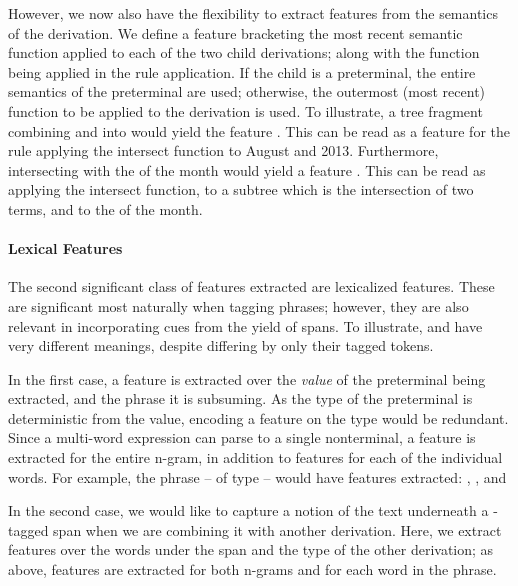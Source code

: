 However, we now also have the flexibility to extract features from the
  semantics of the derivation.
We define a feature bracketing the most recent semantic function
  applied to each of the two child derivations; along with the function being
  applied in the rule application.
If the child is a preterminal, the entire semantics of the preterminal are used;
  otherwise, the outermost (most recent) function to be applied to the
  derivation is used.
To illustrate, a tree fragment combining  and  into
   would yield the feature .
This can be read as a feature for the rule applying the intersect function
  to August and 2013.
Furthermore, intersecting  with the  of the month would
  yield a feature .
This can be read as applying the intersect function, to a subtree which is
  the intersection of two terms, and to the  of the month.


\paragraph{Lexical Features}
The second significant class of features extracted are lexicalized features.
These are significant most naturally when tagging phrases; however, they are
  also relevant in incorporating cues from the yield of  spans.
To illustrate,  and  have very different meanings,
  despite differing by only their  tagged tokens.

In the first case, a feature is extracted over the \textit{value} of the
  preterminal being extracted, and the phrase it is subsuming.
As the type of the preterminal is deterministic from the value, encoding
  a feature on the type would be redundant.
Since a multi-word expression can parse to a single nonterminal, a feature
  is extracted for the entire n-gram, in addition to features for each of the
  individual words.
For example, the phrase  -- of type  -- would have
  features extracted:
  ,
  , and

In the second case, we would like to capture a notion of the text underneath
  a -tagged span when we are combining it with another derivation.
Here, we extract features over the words under the  span and the
  type of the other derivation; as above, features are extracted for both
  n-grams and for each word in the phrase.

